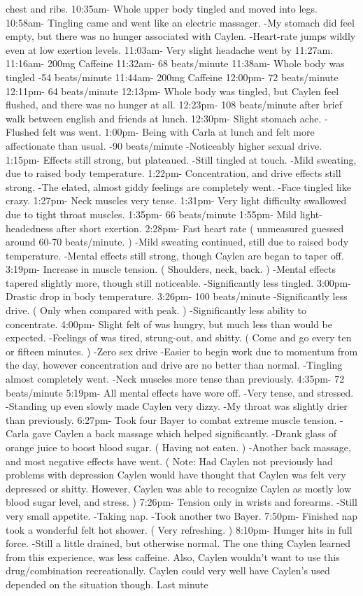 \documentclass[12pt]{book}
\begin{document}
chest and ribs. 10:35am- Whole upper body tingled and moved into legs. 10:58am- Tingling came and went like an electric massager. -My stomach did feel empty, but there was no hunger associated with Caylen. -Heart-rate jumps wildly even at low exertion levels. 11:03am- Very slight headache went by 11:27am. 11:16am- 200mg Caffeine 11:32am- 68 beats/minute 11:38am- Whole body was tingled -54 beats/minute 11:44am- 200mg Caffeine 12:00pm- 72 beats/minute 12:11pm- 64 beats/minute 12:13pm- Whole body was tingled, but Caylen feel flushed, and there was no hunger at all. 12:23pm- 108 beats/minute after brief walk between english and friends at lunch. 12:30pm- Slight stomach ache. -Flushed felt was went. 1:00pm- Being with Carla at lunch and felt more affectionate than usual. -90 beats/minute -Noticeably higher sexual drive. 1:15pm- Effects still strong, but plateaued. -Still tingled at touch. -Mild sweating, due to raised body temperature. 1:22pm- Concentration, and drive effects still strong. -The elated, almost giddy feelings are completely went. -Face tingled like crazy. 1:27pm- Neck muscles very tense. 1:31pm- Very light difficulty swallowed due to tight throat muscles. 1:35pm- 66 beats/minute 1:55pm- Mild light-headedness after short exertion. 2:28pm- Fast heart rate ( unmeasured guessed around 60-70 beats/minute. ) -Mild sweating continued, still due to raised body temperature. -Mental effects still strong, though Caylen are began to taper off. 3:19pm- Increase in muscle tension. ( Shoulders, neck, back. ) -Mental effects tapered slightly more, though still noticeable. -Significantly less tingled. 3:00pm- Drastic drop in body temperature. 3:26pm- 100 beats/minute -Significantly less drive. ( Only when compared with peak. ) -Significantly less ability to concentrate. 4:00pm- Slight felt of was hungry, but much less than would be expected. -Feelings of was tired, strung-out, and shitty. ( Come and go every ten or fifteen minutes. ) -Zero sex drive -Easier to begin work due to momentum from the day, however concentration and drive are no better than normal. -Tingling almost completely went. -Neck muscles more tense than previously. 4:35pm- 72 beats/minute 5:19pm- All mental effects have wore off. -Very tense, and stressed. -Standing up even slowly made Caylen very dizzy. -My throat was slightly drier than previously. 6:27pm- Took four Bayer to combat extreme muscle tension. -Carla gave Caylen a back massage which helped significantly. -Drank glass of orange juice to boost blood sugar. ( Having not eaten. ) -Another back massage, and most negative effects have went. ( Note: Had Caylen not previously had problems with depression Caylen would have thought that Caylen was felt very depressed or shitty. However, Caylen was able to recognize Caylen as mostly low blood sugar level, and stress. ) 7:26pm- Tension only in wrists and forearms. -Still very small appetite. -Taking nap. -Took another two Bayer. 7:50pm- Finished nap took a wonderful felt hot shower. ( Very refreshing. ) 8:10pm- Hunger hits in full force. -Still a little drained, but otherwise normal. The one thing Caylen learned from this experience, was less caffeine. Also, Caylen wouldn't want to use this drug/combination recreationally. Caylen could very well have Caylen's used depended on the situation though. Last minute 
\end{document}
